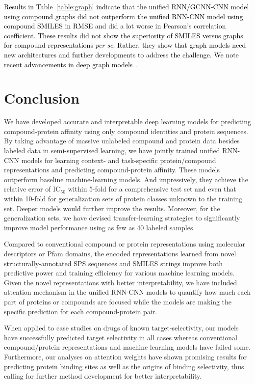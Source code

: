 \documentclass[nocrop]{bioinfo}
\newcommand{\red}[1]{\textcolor{black}{#1}}
\begin{document}
\red{Results in Table~\ref{table:graph} indicate that the unified RNN/GCNN-CNN model using compound graphs did not  outperform the unified RNN-CNN model using compound SMILES in RMSE and did a lot worse in Pearson's correlation coefficient. These results did not show the superiority of SMILES versus graphs for compound representations \textit{per se}.  Rather, they show that graph models need new architectures and further developments to address the challenge. We note recent advancements in deep graph models~\citep{GilmerSRVD17,Coley17,VAE-graph18}.}


\section{Conclusion}

We have developed accurate and interpretable deep learning models for predicting compound-protein affinity using only compound identities and protein sequences.  By taking advantage of massive unlabeled compound and protein data besides labeled data in semi-supervised learning, we have jointly trained unified RNN-CNN models for learning context- and task-specific protein/compound representations and predicting compound-protein affinity.  These models outperform baseline machine-learning models.  And impressively, they achieve the relative error of IC$_{50}$ within 5-fold for a comprehensive test set and even that within 10-fold for generalization sets of protein classes unknown to the training set. Deeper models would further improve the results. Moreover, for the generalization sets, we have devised transfer-learning strategies to significantly improve model performance using as few as 40 labeled samples.  

Compared to conventional compound or protein representations using molecular descriptors or Pfam domains, the encoded representations learned from novel structurally-annotated SPS sequences and SMILES strings improve both predictive power and training efficiency for various  machine learning models. Given the novel representations with better interpretability, we have included attention mechanism in the unified RNN-CNN models to quantify how much each part of proteins or compounds are focused while the models are making the specific  prediction for each compound-protein pair. 

When applied to case studies on drugs of known target-selectivity, our models have successfully predicted target selectivity in all cases whereas conventional compound/protein representations and machine learning models have failed some. Furthermore, our analyses on attention weights have shown promising results for predicting protein binding sites as well as the origins of binding selectivity, thus calling for further method development for better interpretability.  
\end{document}
